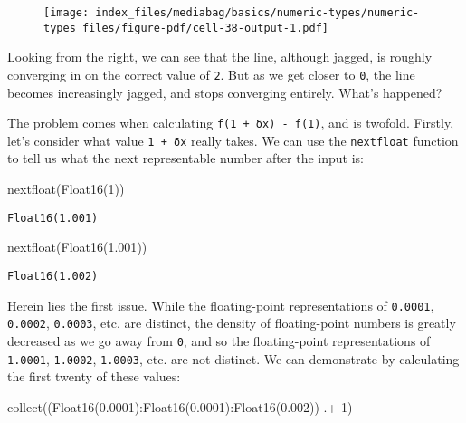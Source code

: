 \documentclass[
  letterpaper,
  DIV=11,
  numbers=noendperiod]{scrreprt}
\newenvironment{Shaded}{\begin{snugshade}}{\end{snugshade}}
\newcommand{\FloatTok}[1]{\textcolor[rgb]{0.68,0.00,0.00}{#1}}
\newcommand{\FunctionTok}[1]{\textcolor[rgb]{0.28,0.35,0.67}{#1}}
\newcommand{\NormalTok}[1]{\textcolor[rgb]{0.00,0.23,0.31}{#1}}
\newcommand{\OperatorTok}[1]{\textcolor[rgb]{0.37,0.37,0.37}{#1}}
\begin{document}
\begin{figure}[H]

{\centering \texttt{[image: index\_files/mediabag/basics/numeric-types/numeric-types\_files/figure-pdf/cell-38-output-1.pdf]}

}

\end{figure}

Looking from the right, we can see that the line, although jagged, is
roughly converging in on the correct value of \texttt{2}. But as we get
closer to \texttt{0}, the line becomes increasingly jagged, and stops
converging entirely. What's happened?

The problem comes when calculating \texttt{f(1\ +\ δx)\ -\ f(1)}, and is
twofold. Firstly, let's consider what value \texttt{1\ +\ δx} really
takes. We can use the \texttt{nextfloat} function to tell us what the
next representable number after the input is:

\begin{Shaded}
\begin{Highlighting}[]
\FunctionTok{nextfloat}\NormalTok{(}\FunctionTok{Float16}\NormalTok{(}\FloatTok{1}\NormalTok{))}
\end{Highlighting}
\end{Shaded}

\begin{verbatim}
Float16(1.001)
\end{verbatim}

\begin{Shaded}
\begin{Highlighting}[]
\FunctionTok{nextfloat}\NormalTok{(}\FunctionTok{Float16}\NormalTok{(}\FloatTok{1.001}\NormalTok{))}
\end{Highlighting}
\end{Shaded}

\begin{verbatim}
Float16(1.002)
\end{verbatim}

Herein lies the first issue. While the floating-point representations of
\texttt{0.0001}, \texttt{0.0002}, \texttt{0.0003}, etc. are distinct,
the density of floating-point numbers is greatly decreased as we go away
from \texttt{0}, and so the floating-point representations of
\texttt{1.0001}, \texttt{1.0002}, \texttt{1.0003}, etc. are not
distinct. We can demonstrate by calculating the first twenty of these
values:

\begin{Shaded}
\begin{Highlighting}[]
\FunctionTok{collect}\NormalTok{((}\FunctionTok{Float16}\NormalTok{(}\FloatTok{0.0001}\NormalTok{)}\OperatorTok{:}\FunctionTok{Float16}\NormalTok{(}\FloatTok{0.0001}\NormalTok{)}\OperatorTok{:}\FunctionTok{Float16}\NormalTok{(}\FloatTok{0.002}\NormalTok{)) }\OperatorTok{.+} \FloatTok{1}\NormalTok{)}
\end{Highlighting}
\end{Shaded}
\end{document}
